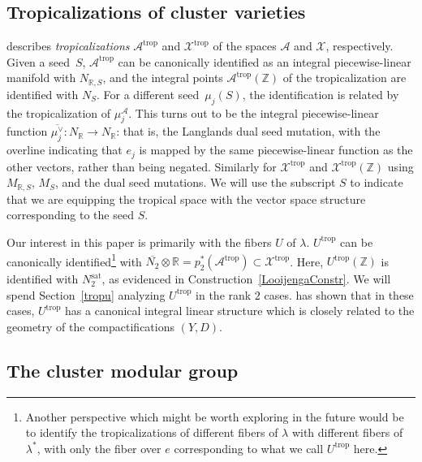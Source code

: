 \documentclass[pdftex]{sigma}
\numberwithin{equation}{section}
\numberwithin{figure}{section}
\numberwithin{table}{section}
\DeclareMathOperator{\trop}{trop}
\DeclareMathOperator{\sat}{sat}
\let\?=\overline
\let\bb=\mathbb
\let\rar=\rightarrow
\let\s=\mathcal
\theoremstyle{definition}
\begin{document}
\subsection{Tropicalizations of cluster varieties}\label{ClusterTrop}
\cite{FG1} describes {\it tropicalizations} $\s{A}^{\trop}$ and $\s{X}^{\trop}$ of the spaces $\s{A}$ and $\s{X}$, respectively. Given a seed~$S$, $\s{A}^{\trop}$ can be canonically identified as an integral piecewise-linear manifold with $N_{\bb{R},S}$, and the integral points $\s{A}^{\trop}(\bb{Z})$ of the tropicalization are identified with $N_S$. For a different seed~$\mu_j(S)$, the identification is related by the tropicalization of $\mu_j^{\s{A}}$. This turns out to be the integral piecewise-linear function $\?{\mu_j^{\vee}}\colon N_{\bb{R}}\rar N_{\bb{R}}$: that is, the Langlands dual seed mutation, with the overline indicating that $e_j$ is mapped by the same piecewise-linear function as the other vectors, rather than being negated. Similarly for $\s{X}^{\trop}$ and $\s{X}^{\trop}(\bb{Z})$ using $M_{\bb{R},S}$, $M_S$, and the dual seed mutations. We will use the subscript $S$ to indicate that we are equipping the tropical space with the vector space structure corresponding to the seed $S$.

Our interest in this paper is primarily with the fibers $U$ of $\lambda$. $U^{\trop}$ can be canonically identified\footnote{Another perspective which might be worth exploring in the future would be to identify the tropicalizations of different fibers of $\lambda$ with different fibers of $\lambda^*$, with only the fiber over $e$ corresponding to what we call $U^{\trop}$ here.} with $\?{N_2}\otimes \bb{R} = p_2^*(\s{A}^{\trop}) \subset \s{X}^{\trop}$. Here, $U^{\trop}(\bb{Z})$ is identified with $N_2^{\sat}$, as evidenced in Construction~\ref{LooijengaConstr}. We will spend Section~\ref{tropu} analyzing $U^{\trop}$ in the rank $2$ cases. \cite{GHK1} has shown that in these cases, $U^{\trop}$ has a canonical integral linear structure which is closely related to the geometry of the compactifications $(Y,D)$.

\subsection{The cluster modular group}\label{CMGdef}
\end{document}
